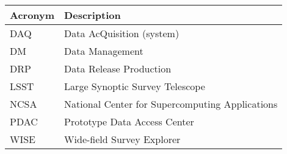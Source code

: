 \addtocounter{table}{-1}
\begin{longtable}{|l|p{}|}\hline 
\textbf{Acronym} & \textbf{Description}  \\\hline
DAQ&Data AcQuisition (system) \\\hline
DM&Data Management \\\hline
DRP&Data Release Production \\\hline
LSST&Large Synoptic Survey Telescope \\\hline
NCSA&National Center for Supercomputing Applications \\\hline
PDAC&Prototype Data Access Center \\\hline
WISE&Wide-field Survey Explorer \\\hline
\end{longtable} 
